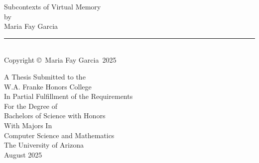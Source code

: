 \documentclass[12pt]{report} %
\newcommand{\CompleteTitle}{Subcontexts of Virtual Memory} %
\newcommand{\FullName}{Maria Fay Garcia} %
\newcommand{\DegreeType}{Bachelors of Science with Honors} %
\newcommand{\HonorsCollege}{W.A. Franke Honors College}
\newcommand{\Major}{Computer Science and Mathematics}
\newcommand{\DegreeYear}{2025}
\newcommand{\DegreeMonthAndYear}{August 2025} %
\newcommand{\UniversityName}{The University of Arizona}
\begin{document}
\nobibliography* %



\thispagestyle{empty} %

\null
\vfill

\begin{center}
\MakeUppercase\CompleteTitle \\ 
\vspace*{1.5em}
by\\
\vspace*{1.5em}
\FullName \\
\vspace*{2em}

\rule{3in}{1pt}\\
\vspace*{-1em}
{\small Copyright \copyright\ \FullName\ \DegreeYear} \\
\vspace*{2em}

A Thesis Submitted to the\\
\vspace*{1.5em}
\MakeUppercase\HonorsCollege \\
\vspace*{1.5em}
In Partial Fulfillment of the Requirements\\
\vspace*{0.5em}
For the Degree of\\
\vspace*{1.5em}
\MakeUppercase\DegreeType \\
\vspace*{1.5em}
With Majors In\\
\vspace*{1.5em}
\MakeUppercase\Major\\
\vspace*{1.5em}
\MakeUppercase\UniversityName\\
\vspace*{3em}
\MakeUppercase\DegreeMonthAndYear
\end{center}

\vfill %
\end{document}

